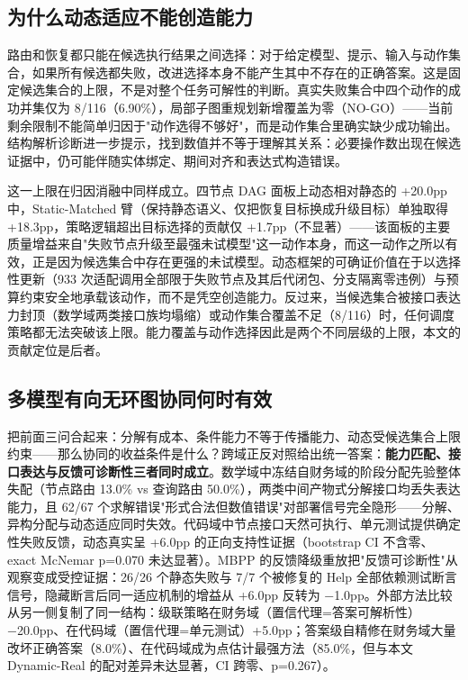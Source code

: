 \subsection{为什么动态适应不能创造能力}\label{sec:5-3}
路由和恢复都只能在候选执行结果之间选择：对于给定模型、提示、输入与动作集合，如果所有候选都失败，改进选择本身不能产生其中不存在的正确答案。这是固定候选集合的上限，不是对整个任务可解性的判断。真实失败集合中四个动作的成功并集仅为 8/116（6.90\%），局部子图重规划新增覆盖为零（NO-GO）——当前剩余限制不能简单归因于"动作选得不够好"，而是动作集合里确实缺少成功输出。结构解析诊断进一步提示，找到数值并不等于理解其关系：必要操作数出现在候选证据中，仍可能伴随实体绑定、期间对齐和表达式构造错误。

这一上限在归因消融中同样成立。四节点 DAG 面板上动态相对静态的 +20.0pp 中，Static-Matched 臂（保持静态语义、仅把恢复目标换成升级目标）单独取得 +18.3pp，策略逻辑超出目标选择的贡献仅 +1.7pp（不显著）——该面板的主要质量增益来自"失败节点升级至最强未试模型"这一动作本身，而这一动作之所以有效，正是因为候选集合中存在更强的未试模型。动态框架的可确证价值在于以选择性更新（933 次适配调用全部限于失败节点及其后代闭包、分支隔离零违例）与预算约束安全地承载该动作，而不是凭空创造能力。反过来，当候选集合被接口表达力封顶（数学域两类接口族均塌缩）或动作集合覆盖不足（8/116）时，任何调度策略都无法突破该上限。能力覆盖与动作选择因此是两个不同层级的上限，本文的贡献定位是后者。

\subsection{多模型有向无环图协同何时有效}\label{sec:5-4}
把前面三问合起来：分解有成本、条件能力不等于传播能力、动态受候选集合上限约束——那么协同的收益条件是什么？跨域正反对照给出统一答案：\textbf{能力匹配、接口表达与反馈可诊断性三者同时成立}。数学域中冻结自财务域的阶段分配先验整体失配（节点路由 13.0\% vs 查询路由 50.0\%），两类中间产物式分解接口均丢失表达能力，且 62/67 个求解错误"形式合法但数值错误"对部署信号完全隐形——分解、异构分配与动态适应同时失效。代码域中节点接口天然可执行、单元测试提供确定性失败反馈，动态真实呈 +6.0pp 的正向支持性证据（bootstrap CI 不含零、exact McNemar p=0.070 未达显著）。MBPP 的反馈降级重放把"反馈可诊断性"从观察变成受控证据：26/26 个静态失败与 7/7 个被修复的 Help 全部依赖测试断言信号，隐藏断言后同一适应机制的增益从 +6.0pp 反转为 −1.0pp。外部方法比较从另一侧复制了同一结构：级联策略在财务域（置信代理=答案可解析性）−20.0pp、在代码域（置信代理=单元测试）+5.0pp；答案级自精修在财务域大量改坏正确答案（8.0\%）、在代码域成为点估计最强方法（85.0\%，但与本文 Dynamic-Real 的配对差异未达显著，CI 跨零、p=0.267）。

